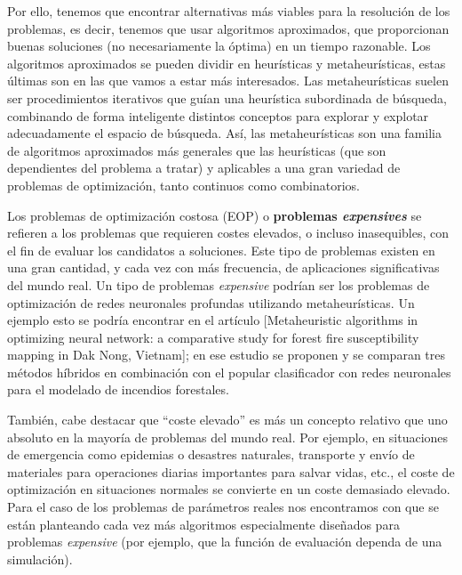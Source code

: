 Por ello, tenemos que encontrar alternativas más viables para la resolución de los problemas, es decir, tenemos que usar algoritmos aproximados, que proporcionan buenas soluciones (no necesariamente la óptima) en un tiempo razonable. 
Los algoritmos aproximados se pueden dividir en heurísticas y metaheurísticas, estas últimas son en las que vamos a estar más interesados. 
Las metaheurísticas suelen ser procedimientos iterativos que guían una heurística subordinada de búsqueda, combinando de forma inteligente distintos conceptos para explorar y explotar adecuadamente el espacio de búsqueda.
Así, las metaheurísticas son una familia de algoritmos aproximados más generales que las heurísticas (que son dependientes del problema a tratar) y aplicables a una gran variedad de problemas de optimización, tanto continuos como combinatorios. 

Los problemas de optimización costosa (EOP) o \textbf{problemas \textit{expensives}} se refieren a los problemas que requieren costes elevados, o incluso inasequibles, con el fin de evaluar los candidatos a soluciones. 
Este tipo de problemas existen en una gran cantidad, y cada vez con más frecuencia, de aplicaciones significativas del mundo real. 
Un tipo de problemas \textit{expensive} podrían ser los problemas de optimización de redes neuronales profundas utilizando metaheurísticas. 
Un ejemplo esto se podría encontrar en el artículo [Metaheuristic algorithms in optimizing neural network: a comparative study for forest fire susceptibility mapping in Dak Nong, Vietnam]; en ese estudio se proponen y se comparan tres métodos híbridos en combinación con el popular clasificador con redes neuronales para el modelado de incendios forestales.

También, cabe destacar que ``coste elevado'' es más un concepto relativo que uno absoluto en la mayoría de problemas del mundo real. 
Por ejemplo, en situaciones de emergencia como epidemias o desastres naturales, transporte y envío de materiales para operaciones diarias importantes para salvar vidas, etc., el coste de optimización en situaciones normales se convierte en un coste demasiado elevado. 
Para el caso de los problemas de parámetros reales nos encontramos con que se están planteando cada vez más algoritmos especialmente diseñados para problemas \textit{expensive} (por ejemplo, que la función de evaluación dependa de una simulación).

